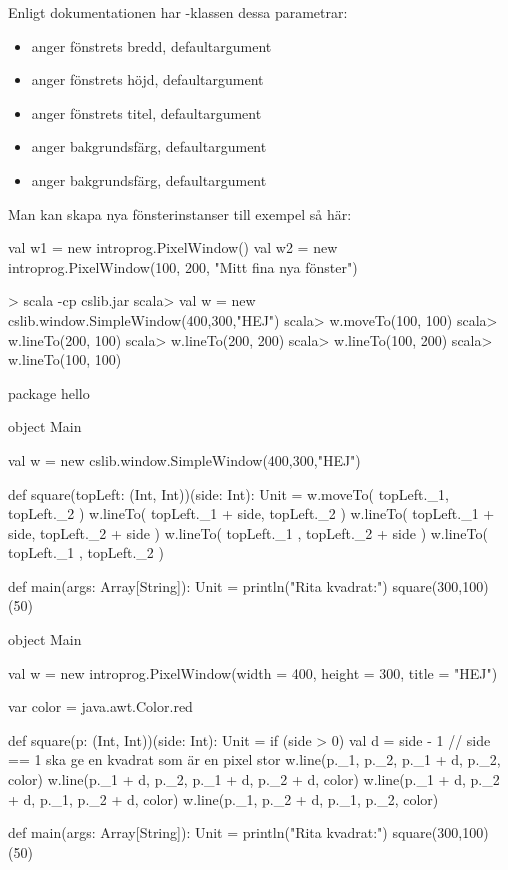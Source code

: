 \SubtaskSolved Enligt dokumentationen har -klassen dessa parametrar:
\begin{itemize}[nolistsep,noitemsep]
  \item {} anger fönstrets bredd, defaultargument 
  \item {} anger fönstrets höjd, defaultargument 
  \item {} anger fönstrets titel, defaultargument 
  \item {} anger bakgrundsfärg, defaultargument 
  \item {} anger bakgrundsfärg, defaultargument 
\end{itemize}
Man kan skapa nya fönsterinstanser till exempel så här:
\begin{Code}
val w1 = new introprog.PixelWindow()
val w2 = new introprog.PixelWindow(100, 200, "Mitt fina nya fönster")
\end{Code}

\SubtaskSolved
\begin{REPL}
> scala -cp cslib.jar
scala> val w = new cslib.window.SimpleWindow(400,300,"HEJ")
scala> w.moveTo(100, 100)
scala> w.lineTo(200, 100)
scala> w.lineTo(200, 200)
scala> w.lineTo(100, 200)
scala> w.lineTo(100, 100)
\end{REPL}

\SubtaskSolved
\begin{Code}
package hello

object Main {
  val w = new cslib.window.SimpleWindow(400,300,"HEJ")

  def square(topLeft: (Int, Int))(side: Int): Unit = {
    w.moveTo( topLeft._1,        topLeft._2        )
    w.lineTo( topLeft._1 + side, topLeft._2        )
    w.lineTo( topLeft._1 + side, topLeft._2 + side )
    w.lineTo( topLeft._1       , topLeft._2 + side )
    w.lineTo( topLeft._1       , topLeft._2        )
  }

  def main(args: Array[String]): Unit = {
    println("Rita kvadrat:")
    square(300,100)(50)
  }
}

object Main {
  val w = new introprog.PixelWindow(width = 400, height = 300, title = "HEJ")

  var color = java.awt.Color.red

  def square(p: (Int, Int))(side: Int): Unit = if (side > 0) {
    val d = side - 1  // side == 1 ska ge en kvadrat som är en pixel stor
    w.line(p._1,     p._2,     p._1 + d, p._2,     color)
    w.line(p._1 + d, p._2,     p._1 + d, p._2 + d, color)
    w.line(p._1 + d, p._2 + d, p._1,     p._2 + d, color)
    w.line(p._1,     p._2 + d, p._1,     p._2,     color)
  }

  def main(args: Array[String]): Unit = {
    println("Rita kvadrat:")
    square(300,100)(50)
  }
}

\end{Code}


